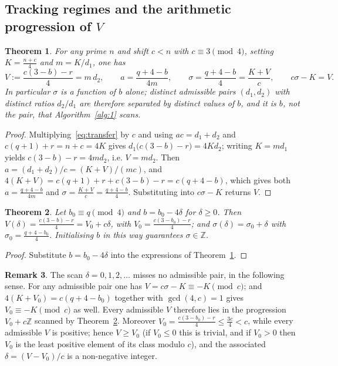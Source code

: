 \documentclass[11pt, a4paper]{article}
\theoremstyle{plain}
\newtheorem{theorem}{Theorem}[section]
\theoremstyle{definition}
\newtheorem{remark}[theorem]{Remark}
\newcommand{\Z}{\mathbb{Z}}
\begin{document}
\subsection{Tracking regimes and the arithmetic progression of $V$} \label{sec:3.5}

\begin{theorem} \label{thm:3.11}
For any prime $n$ and shift $c<n$ with $c \equiv 3 \pmod 4$, setting $K = \frac{n+c}{4}$ and $m=K/d_1$, one has
$$ V:=\frac{c(3-b)-r}{4}=m\,d_2, \qquad a = \frac{q+4-b}{4m}, \qquad \sigma=\frac{q+4-b}{4}=\frac{K+V}{c}, \qquad c\sigma-K=V .$$
In particular $\sigma$ is a function of $b$ alone; distinct admissible pairs $(d_1,d_2)$ with distinct ratios $d_2/d_1$ are therefore separated by distinct values of $b$, and it is $b$, not the pair, that Algorithm~\ref{alg:1} scans.
\end{theorem}
\begin{proof}
Multiplying~\eqref{eq:transfer} by $c$ and using $ac=d_1+d_2$ and $c(q+1)+r=n+c=4K$ gives $d_1\big(c(3-b)-r\big)=4Kd_2$; writing $K=md_1$ yields $c(3-b)-r=4md_2$, i.e. $V=md_2$. Then $a=(d_1+d_2)/c=(K+V)/(mc)$, and $4(K+V)=c(q+1)+r+c(3-b)-r=c(q+4-b)$, which gives both $a=\frac{q+4-b}{4m}$ and $\sigma=\frac{K+V}{c}=\frac{q+4-b}{4}$. Substituting into $c\sigma-K$ returns $V$.
\end{proof}

\begin{theorem} \label{thm:3.16}
Let $b_0 \equiv q \pmod{4}$ and $b = b_0 - 4\delta$ for $\delta \ge 0$. Then $V(\delta) = \frac{c(3-b)-r}{4} = V_0 + c\delta$, with $V_0 = \frac{c(3-b_0)-r}{4}$; and $\sigma(\delta)=\sigma_0+\delta$ with $\sigma_0=\frac{q+4-b_0}{4}$. Initialising $b$ in this way guarantees $\sigma\in\Z$.
\end{theorem}
\begin{proof}
Substitute $b=b_0-4\delta$ into the expressions of Theorem~\ref{thm:3.11}.
\end{proof}

\begin{remark}\label{rem:scan_complete}
The scan $\delta=0,1,2,\dots$ misses no admissible pair, in the following sense. For any admissible pair one has $V=c\sigma-K\equiv-K\pmod c$; and $4(K+V_0)=c(q+4-b_0)$ together with $\gcd(4,c)=1$ gives $V_0\equiv-K\pmod c$ as well. Every admissible $V$ therefore lies in the progression $V_0+c\Z$ scanned by Theorem~\ref{thm:3.16}. Moreover $V_0=\frac{c(3-b_0)-r}{4}\le\frac{3c}{4}<c$, while every admissible $V$ is positive; hence $V\ge V_0$ (if $V_0\le0$ this is trivial, and if $V_0>0$ then $V_0$ is the least positive element of its class modulo $c$), and the associated $\delta=(V-V_0)/c$ is a non-negative integer.
\end{remark}
\end{document}
